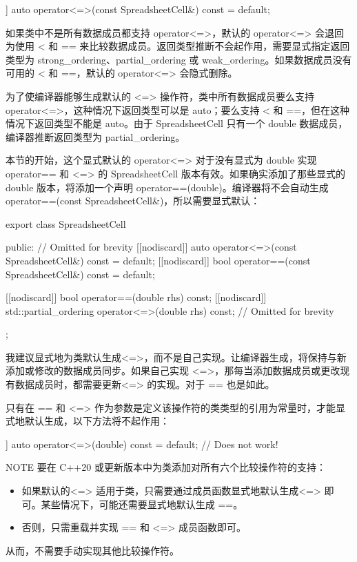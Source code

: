 \begin{cpp}
[[nodiscard]] auto operator<=>(const SpreadsheetCell&) const = default;
\end{cpp}

如果类中不是所有数据成员都支持 operator<=>，默认的 operator<=> 会退回为使用 < 和 == 来比较数据成员。返回类型推断不会起作用，需要显式指定返回类型为 strong\_ordering、partial\_ordering 或 weak\_ordering。如果数据成员没有可用的 < 和 ==，默认的 operator<=> 会隐式删除。

为了使编译器能够生成默认的 <=> 操作符，类中所有数据成员要么支持 operator<=>，这种情况下返回类型可以是 auto；要么支持 < 和 ==，但在这种情况下返回类型不能是 auto。由于 SpreadsheetCell 只有一个 double 数据成员，编译器推断返回类型为 partial\_ordering。

本节的开始，这个显式默认的 operator<=> 对于没有显式为 double 实现 operator== 和 <=> 的 SpreadsheetCell 版本有效。如果确实添加了那些显式的 double 版本，将添加一个声明 operator==(double)。编译器将不会自动生成 operator==(const SpreadsheetCell\&)，所以需要显式默认：

\begin{cpp}
export class SpreadsheetCell
{
    public:
        // Omitted for brevity
        [[nodiscard]] auto operator<=>(const SpreadsheetCell&) const = default;
        [[nodiscard]] bool operator==(const SpreadsheetCell&) const = default;

        [[nodiscard]] bool operator==(double rhs) const;
        [[nodiscard]] std::partial_ordering operator<=>(double rhs) const;
        // Omitted for brevity
};
\end{cpp}

我建议显式地为类默认生成<=>，而不是自己实现。让编译器生成，将保持与新添加或修改的数据成员同步。如果自己实现 <=>，那每当添加数据成员或更改现有数据成员时，都需要更新<=> 的实现。对于 == 也是如此。

只有在 == 和 <=> 作为参数是定义该操作符的类类型的引用为常量时，才能显式地默认生成，以下方法将不起作用：

\begin{cpp}
[[nodiscard]] auto operator<=>(double) const = default; // Does not work!
\end{cpp}

\begin{myNotic}{NOTE}
要在 C++20 或更新版本中为类添加对所有六个比较操作符的支持：

\begin{itemize}
\item
如果默认的<=> 适用于类，只需要通过成员函数显式地默认生成<=> 即可。某些情况下，可能还需要显式地默认生成 ==。

\item
否则，只需重载并实现 == 和 <=> 成员函数即可。
\end{itemize}

从而，不需要手动实现其他比较操作符。
\end{myNotic}
